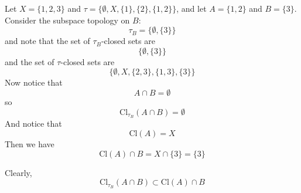 \documentclass[12pt]{article}
\begin{document}
\begin{enumerate}
\begin{enumerate}
Let $X = \{1,2,3\}$ and $\tau = \{\emptyset, X, \{1\}, \{2\}, \{1,2\}\}$, and let $A = \{1,2\}$ and $B = \{3\}$. Consider the subspace topology on $B$:
\[\tau_B = \{\emptyset, \{3\}\}\]
and note that the set of $\tau_B$-closed sets are 
\[\{\emptyset, \{3\}\}\]
and the set of $\tau$-closed sets are
\[\{\emptyset, X, \{2,3\}, \{1,3\}, \{3\}\}\]
Now notice that 
\[A \cap B = \emptyset\]
so
\[\text{Cl}_{\tau_B}(A \cap B) = \emptyset\]
And notice that
\[\text{Cl}(A) = X\]
Then we have
\[\text{Cl}(A) \cap B = X \cap \{3\} = \{3\}\]

Clearly,
\[\text{Cl}_{\tau_B}(A \cap B) \subset \text{Cl}(A) \cap B\]
\end{enumerate}

\end{enumerate}
\end{document}
